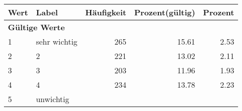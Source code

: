      \begin{longtable}{lXrrr}
     \toprule
     \textbf{Wert} & \textbf{Label} & \textbf{Häufigkeit} & \textbf{Prozent(gültig)} & \textbf{Prozent} \\
     \endhead
     \midrule
     \multicolumn{5}{l}{\textbf{Gültige Werte}}\\

     1 &
     \multicolumn{1}{X}{ sehr wichtig   } &


       \num{265} &
       \num[round-mode=places,round-precision=2]{15,61} &
         \num[round-mode=places,round-precision=2]{2,53} \\

     2 &
     \multicolumn{1}{X}{ 2   } &


       \num{221} &
       \num[round-mode=places,round-precision=2]{13,02} &
         \num[round-mode=places,round-precision=2]{2,11} \\

     3 &
     \multicolumn{1}{X}{ 3   } &


       \num{203} &
       \num[round-mode=places,round-precision=2]{11,96} &
         \num[round-mode=places,round-precision=2]{1,93} \\

     4 &
     \multicolumn{1}{X}{ 4   } &


       \num{234} &
       \num[round-mode=places,round-precision=2]{13,78} &
         \num[round-mode=places,round-precision=2]{2,23} \\

     5 &
     \multicolumn{1}{X}{ unwichtig   } &



\end{longtable}
